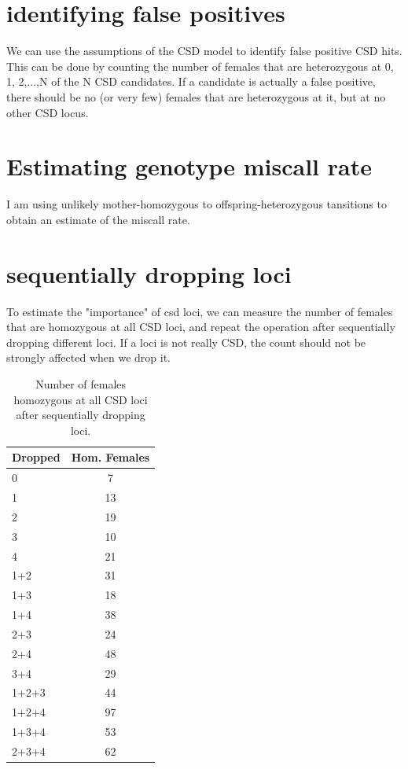 \documentclass[10pt,a4paper]{report}
\begin{document}
\section{identifying false positives}
We can use the assumptions of the CSD model to identify false positive CSD hits. This can be done by counting the number of females that are heterozygous at 0, 1, 2,...,N of the N CSD candidates. If a candidate is actually a false positive, there should be no (or very few) females that are heterozygous at it, but at no other CSD locus.

\section{Estimating genotype miscall rate}
I am using unlikely mother-homozygous to offspring-heterozygous tansitions to obtain an estimate of the miscall rate.

\section{sequentially dropping loci}
To estimate the "importance" of csd loci, we can measure the number of females that are homozygous at all CSD loci, and repeat the operation after sequentially dropping different loci. If a loci is not really CSD, the count should not be strongly affected when we drop it.

\begin{table}[h]
\begin{center}
\begin{tabular}{l c}
Dropped & Hom. Females \\
 \hline
0 & 7 \\
1 & 13 \\
2 & 19 \\
3 & 10 \\
4 & 21 \\
1+2 & 31\\
1+3 & 18\\
1+4 & 38\\
2+3 & 24 \\
2+4 & 48\\
3+4 & 29\\
1+2+3 & 44\\
1+2+4 & 97\\
1+3+4 & 53\\
2+3+4 & 62\\
\end{tabular}
\caption{Number of females homozygous at all CSD loci after sequentially dropping loci.}
\label{table:drop_loci}
\end{center}
\end{table}
\end{document}
